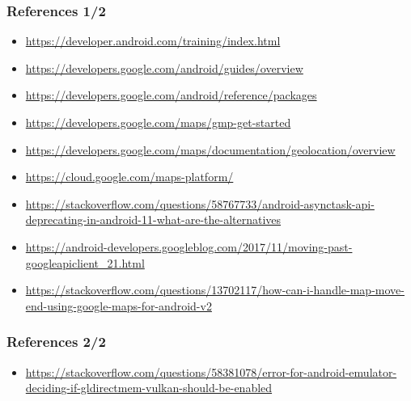 \documentclass[10pt,xcolor=pdflatex]{beamer}
\begin{document}
\begin{frame}[fragile]\frametitle{References 1/2}
\begin{itemize}
	\item \url{https://developer.android.com/training/index.html}
	\item \url{https://developers.google.com/android/guides/overview}
	\item \url{https://developers.google.com/android/reference/packages}
	\item \url{https://developers.google.com/maps/gmp-get-started}
	\item \url{https://developers.google.com/maps/documentation/geolocation/overview}
	\item \url{https://cloud.google.com/maps-platform/}
	\item \url{https://stackoverflow.com/questions/58767733/android-asynctask-api-deprecating-in-android-11-what-are-the-alternatives}
	\item \url{https://android-developers.googleblog.com/2017/11/moving-past-googleapiclient_21.html}
        \item \url{https://stackoverflow.com/questions/13702117/how-can-i-handle-map-move-end-using-google-maps-for-android-v2}
\end{itemize}
\end{frame}

\begin{frame}[fragile]\frametitle{References 2/2}
\begin{itemize}
        \item \url{https://stackoverflow.com/questions/58381078/error-for-android-emulator-deciding-if-gldirectmem-vulkan-should-be-enabled}
\end{itemize}
\end{frame}

\end{document}
